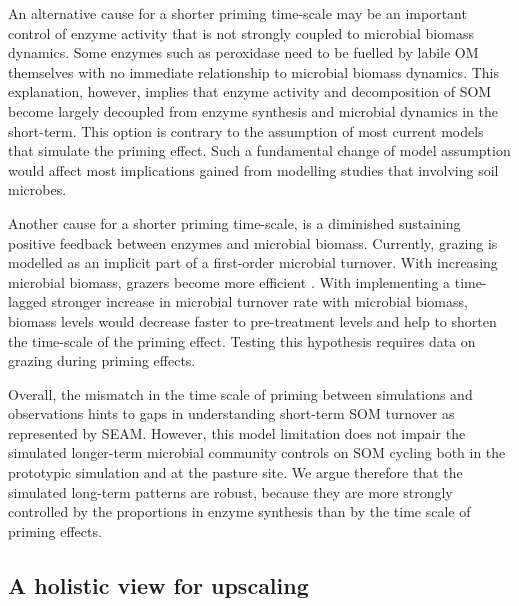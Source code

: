 An alternative cause for a shorter priming time-scale may be an important
control of enzyme activity that is not strongly coupled to microbial biomass
dynamics. Some enzymes such as peroxidase need to be fuelled by labile OM
themselves \citep{Rousk14} with no immediate relationship to microbial biomass
dynamics. This explanation, however, implies that enzyme activity and
decomposition of SOM become largely decoupled from enzyme synthesis and
microbial dynamics in the short-term. This option is contrary to the assumption
of most current models that simulate the priming effect. Such a fundamental
change of model assumption would affect most implications gained from
modelling studies that involving soil microbes.

Another cause for a shorter priming time-scale, is a diminished sustaining
positive feedback between enzymes and microbial biomass. Currently, grazing is
modelled as an implicit part of a first-order microbial turnover. With
increasing microbial biomass, grazers become more efficient \citep{Clarholm81}.
With implementing a time-lagged stronger increase in microbial turnover rate
with microbial biomass, biomass levels would decrease faster to pre-treatment
levels and help to shorten the time-scale of the priming effect. Testing this
hypothesis requires data on grazing during priming effects.

Overall, the mismatch in the time scale of priming between simulations and
observations hints to gaps in understanding short-term SOM turnover as
represented by SEAM. However, this model limitation does not impair the
simulated longer-term microbial community controls on SOM cycling both in the
prototypic simulation and at the pasture site. We argue therefore that the
simulated long-term patterns are robust, because they are more strongly
controlled by the proportions in enzyme synthesis than by the time scale of
priming effects. 

\subsection{A holistic view for upscaling}
\label{sec:Holistic}

